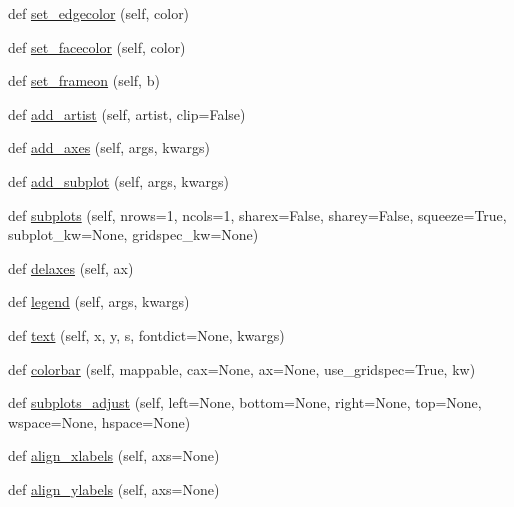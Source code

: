 \begin{DoxyCompactItemize}
\item 
def \hyperlink{classmatplotlib_1_1figure_1_1FigureBase_ae3426fdd53b19510faeb21c959547346}{set\+\_\+edgecolor} (self, color)
\item 
def \hyperlink{classmatplotlib_1_1figure_1_1FigureBase_a58d611bed2cfe9f566f169e96ecece8f}{set\+\_\+facecolor} (self, color)
\item 
def \hyperlink{classmatplotlib_1_1figure_1_1FigureBase_a81c6cabb6943f6a78bf18c53d192bd7a}{set\+\_\+frameon} (self, b)
\item 
def \hyperlink{classmatplotlib_1_1figure_1_1FigureBase_a6bb37f960e32ed4d131f9d0230d8a15b}{add\+\_\+artist} (self, artist, clip=False)
\item 
def \hyperlink{classmatplotlib_1_1figure_1_1FigureBase_a656e99920c3eac791b04ce3d6a536656}{add\+\_\+axes} (self, args, kwargs)
\item 
def \hyperlink{classmatplotlib_1_1figure_1_1FigureBase_af8e902f8ae128964a8aaa1427d834bfe}{add\+\_\+subplot} (self, args, kwargs)
\item 
def \hyperlink{classmatplotlib_1_1figure_1_1FigureBase_ac384bad082f13f18a180ca2249e3ce16}{subplots} (self, nrows=1, ncols=1, sharex=False, sharey=False, squeeze=True, subplot\+\_\+kw=None, gridspec\+\_\+kw=None)
\item 
def \hyperlink{classmatplotlib_1_1figure_1_1FigureBase_a805b75a50a73d09d9ecb6db947e54376}{delaxes} (self, ax)
\item 
def \hyperlink{classmatplotlib_1_1figure_1_1FigureBase_a73aa2a9491580c5b8bb6add11076b0a8}{legend} (self, args, kwargs)
\item 
def \hyperlink{classmatplotlib_1_1figure_1_1FigureBase_a703912750190af71c437d7bb8ce3b098}{text} (self, x, y, s, fontdict=None, kwargs)
\item 
def \hyperlink{classmatplotlib_1_1figure_1_1FigureBase_a2965a716949deee10d58ff0a97419c8c}{colorbar} (self, mappable, cax=None, ax=None, use\+\_\+gridspec=True, kw)
\item 
def \hyperlink{classmatplotlib_1_1figure_1_1FigureBase_a6c53e6b3d14d9b6bc795a9459f7ba956}{subplots\+\_\+adjust} (self, left=None, bottom=None, right=None, top=None, wspace=None, hspace=None)
\item 
def \hyperlink{classmatplotlib_1_1figure_1_1FigureBase_af0abd276bf4f5130daf17b2d5d58c620}{align\+\_\+xlabels} (self, axs=None)
\item 
def \hyperlink{classmatplotlib_1_1figure_1_1FigureBase_a3a2ec771d76a0e7b5e2806139a0c7ec8}{align\+\_\+ylabels} (self, axs=None)
\item 

\end{DoxyCompactItemize}
